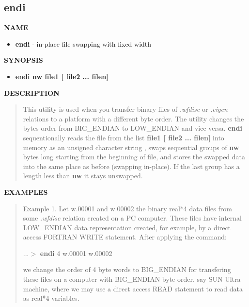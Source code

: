 \subsection{endi}
\vred
{\bf NAME}
\vred
\begin{itemize}
\vred
\item[] {\bf endi} - in-place file swapping with fixed width
\vred
\end{itemize}
\vred
{\bf SYNOPSIS}
\vred
\begin{itemize}
\vred
\item[] {\bf endi nw file1 [ file2 ... filen]}
\end{itemize}
\vred
{\bf DESCRIPTION}
\vred
\begin{quote}
This utility is used when you transfer binary files of {\it .wfdisc} or
{\it .eigen} relations to a platform with  a different byte order.
The utility changes the bytes order from BIG\_ENDIAN to LOW\_ENDIAN
and vice versa. {\bf endi} sequentionally reads the file from the 
list {\bf file1 [ file2 ... filen] } into memory as an unsigned 
character string , swaps sequential groups of {\bf nw} bytes long 
starting from the beginning of file, and stores the
swapped data into the same place as before (swapping in-place).
If the last group has a length less than {\bf nw} it stays unswapped.
\end{quote}
\vred
{\bf EXAMPLES}
\vred
\begin{quote}
Example 1. Let w.00001 and w.00002 the binary real*4 data files from 
some {\it .wfdisc} relation created on a PC computer. These files have 
internal LOW\_ENDIAN data representation created, for example, by 
a direct access FORTRAN WRITE statement. After applying the command:

  $...>$ {\bf endi} 4 w.00001 w.00002

we change the order of 4 byte words to BIG\_ENDIAN for transfering
these files on a computer with BIG\_ENDIAN byte order, say SUN Ultra
machine,  where we may use a direct access READ statement to read 
data as real*4 variables.
\end{quote}

